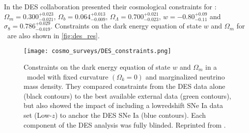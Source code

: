 In \textcite{2019PhRvL.122q1301A} the DES collaboration presented their cosmological constraints for \wCDM: $\Omega_m=0.300^{+0.023}_{-0.021}$, $\Omega_b=0.064^{+0.013}_{-0.009}$, $\Omega_\Lambda=0.700^{+0.021}_{-0.023}$, $w=-0.80^{+0.09}_{-0.11}$ and $\sigma_8=0.786^{+0.029}_{-0.019}$. Constraints on the dark energy equation of state $w$ and $\Omega_m$ for \wCDM\ are also shown in \autoref{fig:des_res}.

\begin{figure}[htb]
    \centering
    \texttt{[image: cosmo\_surveys/DES\_constraints.png]}
    \caption{Constraints on the dark energy equation of state $w$ and $\Omega_m$ in a \wCDM\ model with fixed curvature $(\Omega_k=0)$ and marginalized neutrino mass density. They compared constraints from the DES data alone (black contours) to the best available external data (green contours), but also showed the impact of including a lowredshift SNe Ia data set (Low-$z$) to anchor the DES SNe Ia (blue contours). Each component of the DES analysis was fully blinded. Reprinted from \textcite{2019PhRvL.122q1301A}.}
    \label{fig:des_res}
\end{figure}

